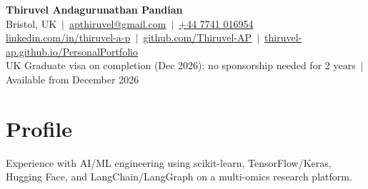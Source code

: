 \documentclass[a4paper,10pt]{article}
\begin{document}
\fontsize{10.5}{12.6}\selectfont

\begin{center}
  {\LARGE\bfseries Thiruvel Andagurunathan Pandian}\\[3pt]
  Bristol, UK \,$|$\, \href{mailto:apthiruvel@gmail.com}{apthiruvel@gmail.com} \,$|$\, \href{tel:+447741016954}{+44 7741 016954}\\[1pt]
\href{https://www.linkedin.com/in/thiruvel-a-p/}{linkedin.com/in/thiruvel-a-p} \,$|$\, \href{https://github.com/Thiruvel-AP}{github.com/Thiruvel-AP} \,$|$\, \href{https://thiruvel-ap.github.io/PersonalPortfolio/}{thiruvel-ap.github.io/PersonalPortfolio}\\[1pt]
  UK Graduate visa on completion (Dec 2026): no sponsorship needed for 2 years \,$|$\, Available from December 2026
\end{center}

\section{Profile}
Experience with AI/ML engineering using scikit-learn, TensorFlow/Keras, Hugging Face, and LangChain/LangGraph on a multi-omics research platform.

\end{document}
